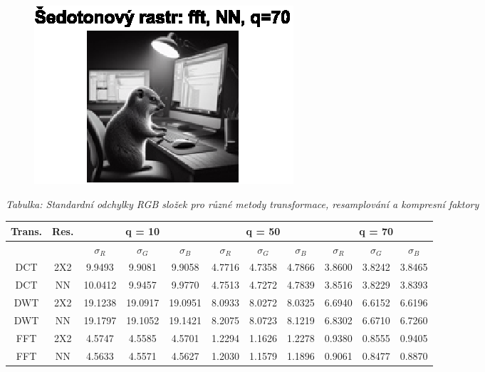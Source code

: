\begin{figure}[H]
\begin{minipage}[b]{0.3\textwidth}
        \includegraphics[width=\textwidth]{images/sedo_fft_NN_q70.eps}
    \end{minipage}
\end{figure}

\begin{table}[H]
    \centering
    \textit{Tabulka: Standardní odchylky RGB složek pro různé metody transformace, resamplování a kompresní faktory}
    
    \begin{tabular}{|c|c|c|c|c|c|c|c|c|c|c|}
    \hline
    \textbf{Trans.} & \textbf{Res.} & \multicolumn{3}{c|}{\textbf{q = 10}} & \multicolumn{3}{c|}{\textbf{q = 50}} & \multicolumn{3}{c|}{\textbf{q = 70}} \\
    \hline
    & & \(\sigma_R\) & \(\sigma_G\) & \(\sigma_B\) & \(\sigma_R\) & \(\sigma_G\) & \(\sigma_B\) & \(\sigma_R\) & \(\sigma_G\) & \(\sigma_B\) \\
    \hline
    DCT & 2X2 & 9.9493 & 9.9081 & 9.9058 & 4.7716 & 4.7358 & 4.7866 & 3.8600 & 3.8242 & 3.8465 \\ \hline
    DCT & NN  & 10.0412 & 9.9457 & 9.9770 & 4.7513 & 4.7272 & 4.7839 & 3.8516 & 3.8229 & 3.8393 \\ \hline
    DWT & 2X2 & 19.1238 & 19.0917 & 19.0951 & 8.0933 & 8.0272 & 8.0325 & 6.6940 & 6.6152 & 6.6196 \\ \hline
    DWT & NN  & 19.1797 & 19.1052 & 19.1421 & 8.2075 & 8.0723 & 8.1219 & 6.8302 & 6.6710 & 6.7260 \\ \hline
    FFT & 2X2 & 4.5747 & 4.5585 & 4.5701 & 1.2294 & 1.1626 & 1.2278 & 0.9380 & 0.8555 & 0.9405 \\ \hline
    FFT & NN  & 4.5633 & 4.5571 & 4.5627 & 1.2030 & 1.1579 & 1.1896 & 0.9061 & 0.8477 & 0.8870 \\ \hline
    \end{tabular}
\end{table}